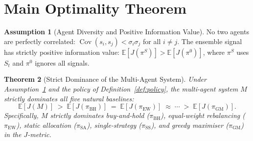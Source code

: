 \documentclass[12pt,openany]{book}
\DeclareMathOperator{\Cov}{Cov}
\numberwithin{equation}{chapter}
\theoremstyle{plain}
\newtheorem{theorem}{Theorem}[chapter]
\theoremstyle{definition}
\newtheorem{assumption}[theorem]{Assumption}
\theoremstyle{remark}
\def\mathcal#1{#1}%
\begin{document}
\section{Main Optimality Theorem}

\begin{assumption}[Agent Diversity and Positive Information Value]
\label{asm:diversity}
No two agents are perfectly correlated:
$\Cov(s_i, s_j) < \sigma_i \sigma_j$ for all $i \neq j$.
The ensemble signal has strictly positive information value:
$\mathbb{E}[J(\pi^S)] > \mathbb{E}[J(\pi^0)]$, where $\pi^S$
uses $S_t$ and $\pi^0$ ignores all signals.
\end{assumption}

\begin{theorem}[Strict Dominance of the Multi-Agent System]
\label{thm:dominance}
Under Assumption~\ref{asm:diversity} and the policy of
Definition~\ref{def:policy}, the multi-agent system $\mathcal{M}$
strictly dominates all five natural baselines:
\begin{equation}
  \mathbb{E}[J(\mathcal{M})] \;>\;
  \mathbb{E}[J(\pi_{\mathrm{BH}})]
  \;=\; \mathbb{E}[J(\pi_{\mathrm{EW}})]
  \;\approx\; \cdots
  \;>\; \mathbb{E}[J(\pi_{\mathrm{GM}})].
  \label{eq:dominance}
\end{equation}
Specifically, $\mathcal{M}$ strictly dominates buy-and-hold
($\pi_{\mathrm{BH}}$), equal-weight rebalancing
($\pi_{\mathrm{EW}}$), static allocation ($\pi_{\mathrm{SA}}$),
single-strategy ($\pi_{\mathrm{SS}}$), and greedy maximiser
($\pi_{\mathrm{GM}}$) in the $J$-metric.
\end{theorem}
\end{document}
